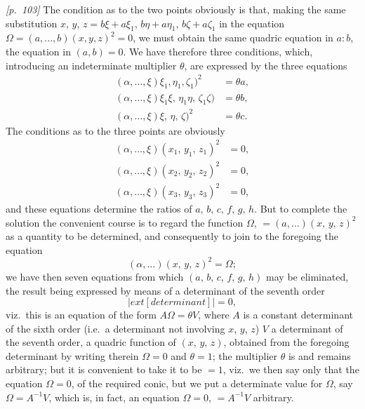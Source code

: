 \documentclass[11pt,a4paper]{article}
\theoremstyle{plain}
\theoremstyle{definition}
\theoremstyle{remark}
\begin{document}
\bigskip\noindent\textit{[p.~103]} The condition as to the two points obviously is that, making the same substitution $x$, $y$, $z = b\xi + a\xi_1$, $b\eta + a\eta_1$, $b\zeta + a\zeta_1$ in the equation $\Omega = (a, ..., b)(x, y, z)^2 = 0$, we must obtain the same quadric equation in $a:b$, the equation in $(a, b) = 0$. We have therefore three conditions, which, introducing an indeterminate multiplier $\theta$, are expressed by the three equations
\begin{align*}
(\alpha, \ldots, \xi)\xi_1, \eta_1, \zeta_1)^2 &= \theta a,\\
(\alpha, \ldots, \xi)\xi_1\xi,\, \eta_1\eta,\, \zeta_1\zeta) &= \theta b,\\
(\alpha, \ldots, \xi)\xi,\, \eta,\, \zeta)^2 &= \theta c.
\end{align*}
The conditions as to the three points are obviously
\begin{align*}
(\alpha, \ldots, \xi)(x_1,\,y_1,\,z_1)^2 &= 0,\\
(\alpha, \ldots, \xi)(x_2,\,y_2,\,z_2)^2 &= 0,\\
(\alpha, \ldots, \xi)(x_3,\,y_3,\,z_3)^2 &= 0,
\end{align*}
and these equations determine the ratios of $a,\,b,\,c,\,f,\,g,\,h$. But to complete the solution the convenient course is to regard the function $\Omega$, $= (a, \ldots)(x,\,y,\,z)^2$ as a quantity to be determined, and consequently to join to the foregoing the equation
\[
(\alpha, \ldots)(x,\,y,\,z)^2 = \Omega;
\]
we have then seven equations from which $(a,\,b,\,c,\,f,\,g,\,h)$ may be eliminated, the result being expressed by means of a determinant of the seventh order
\[
\left|
	ext{[determinant]}
\right| = 0,
\]
viz.\ this is an equation of the form $A\Omega = \theta V$, where $A$ is a constant determinant of the sixth order (i.e.\ a determinant not involving $x$, $y$, $z$) $V$ a determinant of the seventh order, a quadric function of $(x,\,y,\,z)$, obtained from the foregoing determinant by writing therein $\Omega = 0$ and $\theta = 1$; the multiplier $\theta$ is and remains arbitrary; but it is convenient to take it to be $= 1$, viz.\ we then say only that the equation $\Omega = 0$, of the required conic, but we put a determinate value for $\Omega$, say $\Omega = A^{-1}V$, which is, in fact, an equation $\Omega = 0$, $= A^{-1}V$ arbitrary.

\bigskip

\end{document}
